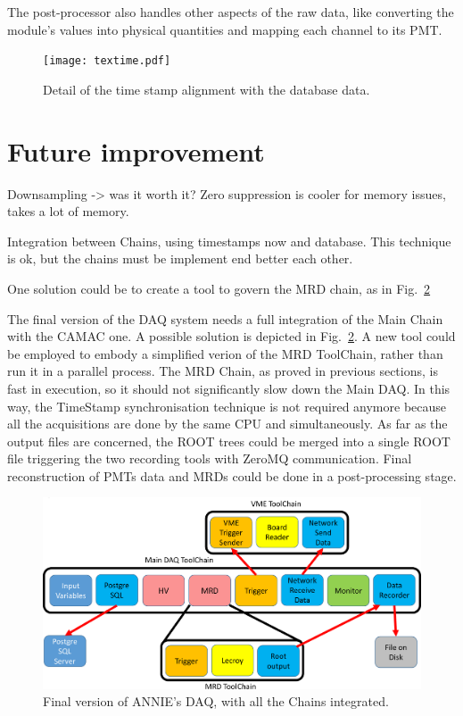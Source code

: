 The post-processor also handles other aspects of the raw data, like converting the module's values %
into physical quantities and mapping each channel to its PMT.

\begin{figure}
  \centering
  \texttt{[image: textime.pdf]}
  \caption{Detail of the time stamp alignment with the database data.}
  \label{fig:tdcpost}
\end{figure}

\section{Future improvement}
\label{sec:3.3}
{
\color{red}
Downsampling -> was it worth it?
Zero suppression is cooler for memory issues, takes a lot of memory.

Integration between Chains, using timestamps now and database.
This technique is ok, but the chains must be implement end better each other.

One solution could be to create a tool to govern the MRD chain, as in Fig.~\ref{fig:daqcomplete}
}

The final version of the DAQ system needs a full integration of the Main Chain with the %
CAMAC one.
A possible solution is depicted in Fig.~\ref{fig:daqcomplete}.
A new tool could be employed to embody a simplified verion of the MRD ToolChain, rather than %
run it in a parallel process.
The MRD Chain, as proved in previous sections, is fast in execution, so it should not %
significantly slow down the Main DAQ.
In this way, the TimeStamp synchronisation technique is not required anymore because all the %
acquisitions are done by the same CPU and simultaneously.
As far as the output files are concerned, the ROOT trees could be merged into a single ROOT file %
triggering the two recording tools with ZeroMQ communication.
Final reconstruction of PMTs data and MRDs could be done in a post-processing stage.

\begin{figure}[]
  \centering
  \includegraphics[scale=0.17]{pics/pag5richardshkmeeting}
  \caption{Final version of ANNIE's DAQ, with all the Chains integrated.}
  \label{fig:daqcomplete}
\end{figure}

